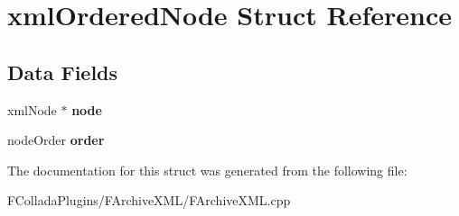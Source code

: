 \hypertarget{structxmlOrderedNode}{
\section{xmlOrderedNode Struct Reference}
\label{structxmlOrderedNode}
}
\subsection*{Data Fields}
\begin{DoxyCompactItemize}
\item 
\hypertarget{structxmlOrderedNode_a1e65dbce17cb5a372261a792bd28845e}{
xmlNode $\ast$ {\bfseries node}}
\label{structxmlOrderedNode_a1e65dbce17cb5a372261a792bd28845e}

\item 
\hypertarget{structxmlOrderedNode_ae4d2f1749b89328bf22142f1fa70383b}{
nodeOrder {\bfseries order}}
\label{structxmlOrderedNode_ae4d2f1749b89328bf22142f1fa70383b}

\end{DoxyCompactItemize}


The documentation for this struct was generated from the following file:\begin{DoxyCompactItemize}
\item 
FColladaPlugins/FArchiveXML/FArchiveXML.cpp\end{DoxyCompactItemize}
